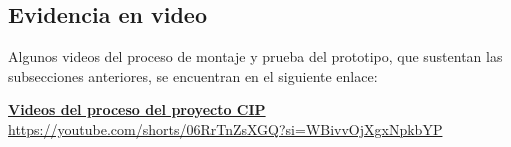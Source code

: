 
\subsection{Evidencia en video}\label{sec:montaje_video}

Algunos videos del proceso de montaje y prueba del prototipo, que sustentan las subsecciones anteriores, se encuentran en el siguiente enlace:

\begin{center}
\href{https://youtube.com/shorts/06RrTnZsXGQ?si=WBivvOjXgxNpkbYP}{\textbf{Videos del proceso del proyecto CIP}}\\[1mm]
\footnotesize\url{https://youtube.com/shorts/06RrTnZsXGQ?si=WBivvOjXgxNpkbYP}
\end{center}
